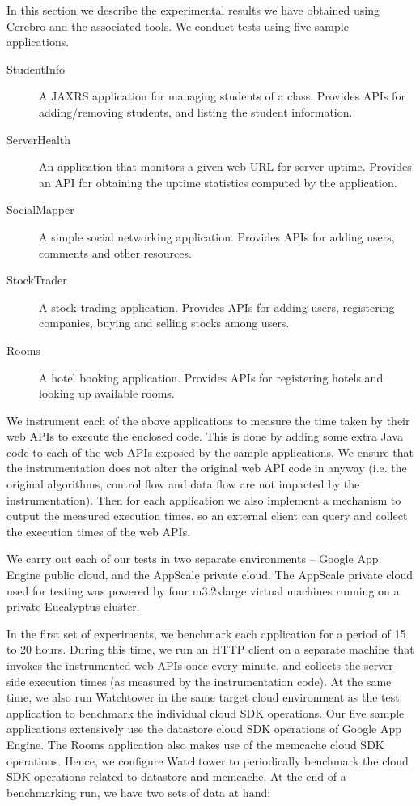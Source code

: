 In this section we describe the experimental results we have obtained using Cerebro and the associated tools. We conduct
tests using five sample applications. 

\begin{description}
\item[StudentInfo] A JAXRS application for managing students of a class. Provides APIs for
adding/removing students, and listing the student information.
\item[ServerHealth] An application that monitors a given web URL for server uptime. Provides an
API for obtaining the uptime statistics computed by the application.
\item[SocialMapper] A simple social networking application. Provides APIs for adding users,
comments and other resources.
\item[StockTrader] A stock trading application. Provides APIs for adding users, registering
companies, buying and selling stocks among users.
\item[Rooms] A hotel booking application. Provides APIs for registering hotels and looking up
available rooms.
\end{description}

We instrument each of the above applications to measure the time taken by their web APIs to execute the
enclosed code. This is done by adding some extra Java code to each of the web APIs exposed by the sample applications.
We ensure that the instrumentation does not alter the original web API code in anyway (i.e. the original algorithms, control flow
and data flow are not impacted by the instrumentation). Then for each application we also
implement a mechanism to output the measured execution times, so an external client can query and collect the execution
times of the web APIs.

We carry out each of our tests in two separate environments -- Google App Engine public cloud, and
the AppScale private cloud. The AppScale private cloud used for testing was powered by four m3.2xlarge virtual machines 
running on a private Eucalyptus cluster.

In the first set of experiments, we benchmark each application for a period of 15 to 20 hours.
During this time, we run an HTTP client on a separate machine that invokes the instrumented web APIs once every minute, 
and collects the server-side execution times (as measured by the instrumentation code).
At the same time, we also run Watchtower in the same target cloud environment as the test application to
benchmark the individual cloud SDK operations. Our five sample applications extensively use the datastore cloud SDK 
operations of Google App Engine. The Rooms application also makes use of the memcache cloud SDK operations. Hence,
we configure Watchtower to periodically benchmark the cloud SDK operations related to datastore and memcache. 
At the end of a benchmarking run, we have two sets of data at hand:

